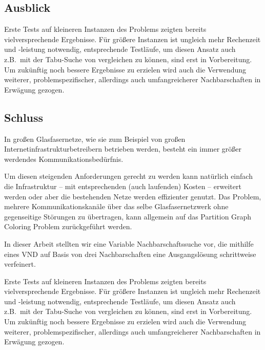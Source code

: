 \documentclass[paper=a4,fontsize=12pt]{scrartcl}
\begin{document}
\subsection{Ausblick}

Erste Tests auf kleineren Instanzen des Problems zeigten bereits vielversprechende Ergebnisse. Für größere Instanzen ist ungleich mehr Rechenzeit und -leistung notwendig, entsprechende Testläufe, um diesen Ansatz auch z.B.\ mit der Tabu-Suche von \citet*{Noronha2006} vergleichen zu können, sind erst in Vorbereitung. Um zukünftig noch bessere Ergebnisse zu erzielen wird auch die Verwendung  weiterer, problemspezifischer, allerdings auch umfangreicherer Nachbarschaften in Erwägung gezogen.

\subsection{Schluss}
In großen Glasfasernetze, wie sie zum Beispiel von großen Internetinfrastrukturbetreibern betrieben werden, besteht ein immer größer werdendes Kommunikationsbedürfnis.

Um diesen steigenden Anforderungen gerecht zu werden kann natürlich einfach die Infrastruktur -- mit entsprechenden (auch laufenden) Kosten -- erweitert werden oder aber die bestehenden Netze werden effizienter genutzt. Das Problem, mehrere Kommunikationskanäle über das selbe Glasfasernetzwerk ohne gegenseitige Störungen zu übertragen, kann allgemein auf das Partition Graph Coloring Problem zurückgeführt werden.

In dieser Arbeit stellten wir eine Variable Nachbarschaftssuche vor, die mithilfe eines VND auf Basis von drei Nachbarschaften eine Ausgangslösung schrittweise verfeinert.

Erste Tests auf kleineren Instanzen des Problems zeigten bereits vielversprechende Ergebnisse. Für größere Instanzen ist ungleich mehr Rechenzeit und -leistung notwendig, entsprechende Testläufe, um diesen Ansatz auch z.B.\ mit der Tabu-Suche von \citet*{Noronha2006} vergleichen zu können, sind erst in Vorbereitung. Um zukünftig noch bessere Ergebnisse zu erzielen wird auch die Verwendung  weiterer, problemspezifischer, allerdings auch umfangreicherer Nachbarschaften in Erwägung gezogen.

\end{document}
